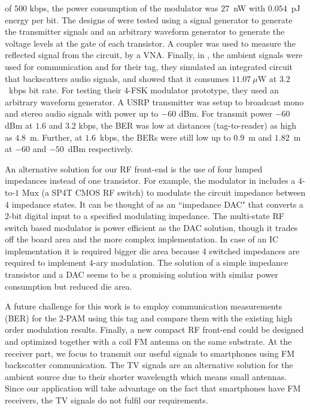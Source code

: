 \documentclass[journal]{IEEEtran}
\begin{document}
of $500$ kbps, the power consumption of the modulator was $27$~nW with $0.054$~pJ energy per bit.  
%
The designs of \cite{correia2017quadrature, correia2018dual} were tested  using a signal generator to generate the transmitter signals 
 and an arbitrary waveform generator  to generate the voltage levels at the gate of each transistor. 
%
A coupler was used to measure the reflected signal from the circuit, by a VNA.
%
%
Finally, in  \cite{wang2017fm}, the ambient signals  were  used for communication and for their tag, they  simulated an integrated circuit that backscatters audio signals, and showed that it consumes $11.07~\mu$W at $3.2$~kbps bit rate.
%
For testing their $4$-FSK modulator prototype, they used an arbitrary waveform generator.
%
A USRP transmitter was setup to broadcast  mono and stereo audio signals with power up to $-60$ dBm.
% 
For transmit power $-60$ dBm at $1.6$ and $3.2$ kbps, the BER was low at distances (tag-to-reader) as high as $4.8$~m.
%
Further, at $1.6$~kbps, the BERs were still low up to $0.9$~m and $1.82$~m at $-60$ and $-50$~dBm respectively.
%

An alternative solution for our RF front-end is the use of four lumped impedances instead of one transistor. 
%
For example, the modulator in \cite{thomas2012quadrature, qian2018iot} includes a $4$-to-$1$ Mux (a SP4T CMOS RF switch) to modulate the circuit impedance between $4$ impedance states. 
%
It can be thought of as an ``impedance DAC" that converts a 2-bit digital input to a specified modulating impedance. 
%
The multi-state RF switch based modulator is power efficient as the DAC solution, though it trades off the board area and the more complex implementation. 
%
In case of an IC implementation it is required  bigger die area because $4$ switched impedances are required to implement $4$-ary modulation.  
%
The solution of a simple impedance transistor and a DAC 
seems to be a promising solution with similar power consumption but reduced die area.



A future challenge for this  work is to employ communication measurements (BER) for the $2$-PAM using this tag and compare them with the existing  high order modulation results. 
%
%
Finally, a new  compact RF front-end  could be designed and optimized together with a coil FM antenna on the same substrate.
%
At the receiver part, we focus to transmit our useful signals to smartphones using FM backscatter
communication. 
%
The TV signals are an alternative solution for the ambient source due to their shorter wavelength which means small antennas. 
%
Since our application will take advantage on the fact that smartphones have FM receivers, the TV signals do not fulfil our requirements.
\end{document}
